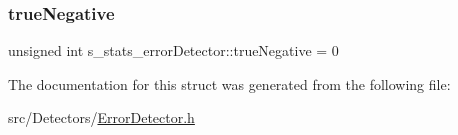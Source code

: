 \subsubsection{\texorpdfstring{true\+Negative}{trueNegative}}
{\footnotesize\ttfamily unsigned int s\+\_\+stats\+\_\+error\+Detector\+::true\+Negative = 0}



The documentation for this struct was generated from the following file\+:\begin{DoxyCompactItemize}
\item 
src/\+Detectors/\hyperlink{ErrorDetector_8h}{Error\+Detector.\+h}\end{DoxyCompactItemize}
